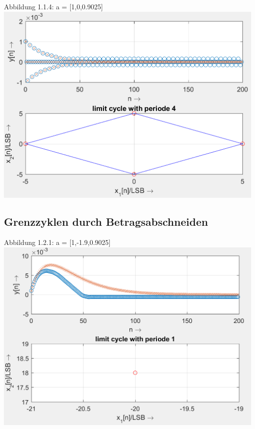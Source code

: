 \begin{center}
Abbildung 1.1.4: a = [1,0,0.9025]\\
\includegraphics[scale=0.9]{../Tab1_4.PNG}
\end{center}

\newpage

\subsection{Grenzzyklen durch Betragsabschneiden}

\begin{center}
Abbildung 1.2.1: a = [1,-1.9,0.9025]\\
\includegraphics[scale=0.9]{../Tab2_1.PNG}
\end{center}

